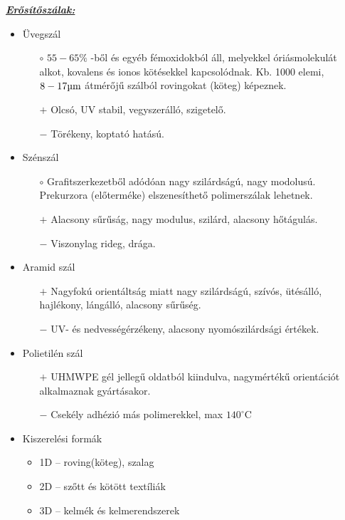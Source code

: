 \documentclass[12pt,a4paper]{article}       %
\newcounter{questionctr}
\newenvironment{question}[1]{
  \refstepcounter{questionctr}
  \begin{tcolorbox}[
    colback=gray!25,
    colbacktitle=red!10!yellow!50,
    enhanced,
    sharp corners,
    boxrule=0mm,
    frame hidden,
    breakable,
    enhanced jigsaw,
    title={\textcolor{black}{\textsc{\# \thequestionctr{} – #1}}}
  ]


}{\end{tcolorbox}}
\begin{document}
\begin{question}{
    Milyen erősítőszálakat és milyen mátrixanyagokat használnak polimer
    kompozitokban? Miért használunk szálakat erősítésre? Mit nevezünk
    szálparadoxonnak? Miért érdemes szendvicsszerkezeteket használni?
  }
  \underline{\textit{\textbf{Erősítőszálak:}}}
  \begin{itemize}
    \item Üvegszál
          \begin{itemize}
            \item[$\circ$] $55-65\%$ -ből és egyéb fémoxidokból
              áll, melyekkel óriásmolekulát alkot, kovalens és ionos kötésekkel
              kapcsolódnak. Kb. 1000 elemi, $8-17 \text{\textmu m}$ átmérőjű
              szálból rovingokat (köteg) képeznek.
            \item[$+$] Olcsó, UV stabil, vegyszerálló, szigetelő.
            \item[$-$] Törékeny, koptató hatású.
          \end{itemize}
    \item Szénszál
          \begin{itemize}
            \item[$\circ$] Grafitszerkezetből adódóan nagy szilárdságú, nagy
              modolusú. Prekurzora (előterméke) elszenesíthető polimerszálak
              lehetnek.
            \item[$+$] Alacsony sűrűság, nagy modulus, szilárd, alacsony
              hőtágulás.
            \item[$-$] Viszonylag rideg, drága.
          \end{itemize}
    \item Aramid szál
          \begin{itemize}
            \item[$+$] Nagyfokú orientáltság miatt nagy szilárdságú,
              szívós, ütésálló, hajlékony, lángálló, alacsony sűrűség.
            \item[$-$] UV- és nedvességérzékeny, alacsony nyomószilárdsági
              értékek.
          \end{itemize}
    \item Polietilén szál
          \begin{itemize}
            \item[$+$] UHMWPE gél jellegű oldatból kiindulva, nagymértékű
              orientációt alkalmaznak gyártásakor.
            \item[$-$] Csekély adhézió más polimerekkel, max
              $140^\circ\mathrm{C}$
          \end{itemize}
    \item Kiszerelési formák
          \begin{itemize}
            \item 1D – roving(köteg), szalag
            \item 2D – szőtt és kötött textíliák
            \item 3D – kelmék és kelmerendszerek
          \end{itemize}
  \end{itemize}
  \tcbline


\end{question}
\end{document}
